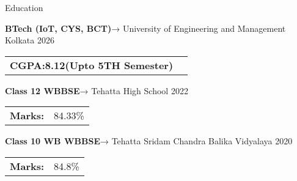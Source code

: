 \documentclass{resume}
\begin{document}

\vspace{-0.4em}
\begin{rSection}{Education}

    {\bf BTech (IoT, CYS, BCT)}→ University of Engineering and Management Kolkata \hfill {2026}\\
    \begin{tabular}{>{\bfseries}l l}
        CGPA:8.12(Upto 5TH Semester)
    \end{tabular}

    \vspace{-0.4em}
    {\bf Class 12 WBBSE}→ Tehatta High School \hfill {2022}\\
    \begin{tabular}{>{\bfseries}l l}
        Marks:    & 84.33\%
    \end{tabular}

    {\bf Class 10 WB WBBSE}→ Tehatta Sridam Chandra Balika Vidyalaya \hfill {2020}\\
    \begin{tabular}{>{\bfseries}l l}
        Marks:    & 84.8\%
    \end{tabular}
\end{rSection}
\vspace{-0.4em}

\end{document}
